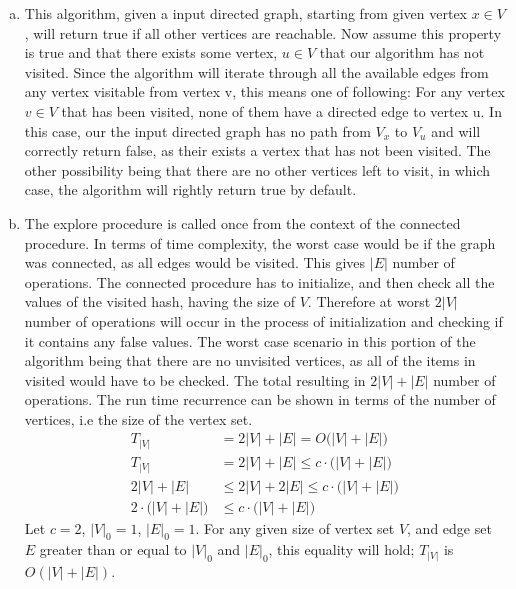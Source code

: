 \documentclass[10pt]{article}
\begin{document}
\begin{question}
\begin{enumerate}[a)]
\begin{algorithm}[H]
\begin{algorithmic}[1]
                \end{algorithmic}
            \end{algorithm}
        \item %
            This algorithm, given a input directed graph, starting from given vertex $x \in V$, will return true if all other vertices are reachable. Now assume this property is true and that there exists some vertex, $u \in V$ that our algorithm has not visited. Since the algorithm will iterate through all the available edges from any vertex visitable from vertex v, this means one of following: \newline \newline
            For any vertex $v \in V$ that has been visited, none of them have a directed edge to vertex u. In this case, our the input directed graph has no path from $V_x$ to $V_u$ and will correctly return false, as their exists a vertex that has not been visited. \newline \newline
            The other possibility being that there are no other vertices left to visit, in which case, the algorithm will rightly return true by default.
        \item %
            The explore procedure is called once from the context of the connected procedure. In terms of time complexity, the worst case would be if the graph was connected, as all edges would be visited. This gives $|E|$ number of operations. \newline \newline
            The connected procedure has to initialize, and then check all the values of the visited hash, having the size of $V$. Therefore at worst $2|V|$ number of operations will occur in the process of initialization and checking if it contains any false values. The worst case scenario in this portion of the algorithm being that there are no unvisited vertices, as all of the items in visited would have to be checked.
            \newline \newline
            The total resulting in $2|V| + |E|$ number of operations. The run time recurrence can be shown in terms of the number of vertices, i.e the size of the vertex set.
            \begin{align*}
                    T_{|V|}    &= 2|V| + |E| = O\big(|V| + |E|\big) \\
                    T_{|V|}    &= 2|V| + |E| \leq c \cdot \big(|V| + |E|\big) \\
                2|V| + |E| &\leq 2|V| + 2|E| \leq c \cdot \big(|V| + |E|\big) \\
                2 \cdot \big(|V| + |E|\big) &\leq c \cdot \big(|V| + |E|\big)
            \end{align*}
            Let $c=2$, $|V|_0 = 1$, $|E|_0 = 1$. For any given size of vertex set $V$, and edge set $E$ greater than or equal to $|V|_0$ and $|E|_0$, this equality will hold; $T_{|V|}$ is $O(|V| + |E|)$.
    \end{enumerate}
    

\end{question}
\end{document}
